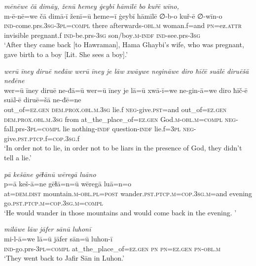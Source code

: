 \ea \label{BP.205}
\textit{mēnēwe čā dimāy, ženū ħemey ġeybī hāmīlē bo kuřē wīno,} \\ 
\gll m-ē-nē=we čā dimā-ī ženī=ū ħeme=ī ġeybī hāmīlē ∅-b-o kuř-ē ∅-wīn-o \\ 
 \textsc{ind-}come.prs\textsc{.3sg}\textsc{-3pl}\textsc{=compl} there afterwards\textsc{-obl}\textsc{.m} woman.f=and \textsc{pn}=ez.\textsc{attr} invisible pregnant.f \textsc{ind-}be.prs\textsc{-3sg} son/boy\textsc{.m}\textsc{-indf} \textsc{ind-}see.prs\textsc{-3sg} \\ 
\glt `After they came back [to Hawraman], Hama Ghaybi’s wife, who was pregnant, gave birth to a boy [Lit. She sees a boy].'
\z 
 
\ea \label{BP.211}
\textit{werū īney diruē neđāw werū īney je lāw xwāywe negināwe diro ħīčē suālē diruēšā neđēne} \\ 
\gll wer=ū īney diruē ne-đā=ū wer=ū īney je lā=ū xwā-ī=we ne-gin-ā=we diro ħīč-ē suāl-ē diruē=šā ne-đē=ne \\ 
 out\_of\textsc{=ez.gen} \textsc{dem.prox}\textsc{.obl}\textsc{.m}\textsc{.3sg} lie.f \textsc{neg-}give\textsc{.pst}=and out\_of\textsc{=ez.gen} \textsc{dem.prox}\textsc{.obl}\textsc{.m}\textsc{.3sg} from at\_the\_place\_of\textsc{=ez.gen} God\textsc{.m}\textsc{-obl}\textsc{.m}\textsc{=compl} \textsc{neg-}fall.prs\textsc{-3pl}\textsc{=compl} lie nothing\textsc{-indf} question\textsc{-indf} lie.f\textsc{=3pl} \textsc{neg-}give\textsc{.pst}\textsc{.ptcp}.f\textsc{=cop}\textsc{.3sg}.f \\ 
\glt `In order not to lie, in order not to be liars in the presence of God, they didn’t tell a lie.'
\z 
 
\ea \label{ŠJ.8}
\textit{pā kešāne gēɫānū wēregā luāno} \\ 
\gll p=ā keš-ā=ne gēɫā=n=ū wēregā luā=n=o \\ 
 at=\textsc{dem.dist} mountain\textsc{.m}\textsc{-obl}\textsc{.pl}\textsc{=\textsc{post}} wander\textsc{.pst}\textsc{.ptcp}\textsc{.m}\textsc{=cop}\textsc{.3sg}\textsc{.m}=and evening go\textsc{.pst}\textsc{.ptcp}\textsc{.m}\textsc{=cop}\textsc{.3sg}\textsc{.m}\textsc{=compl} \\ 
\glt `He would wander in those mountains and would come back in the evening. '
\z 
 
\ea \label{ŠJ.13}
\textit{milāwe lāw jāfer sānū luhonī} \\ 
\gll mi-l-ā=we lā=ū jāfer sān=ū luhon-ī \\ 
 \textsc{ind-}go.prs\textsc{-3pl}\textsc{=compl} at\_the\_place\_of\textsc{=ez.gen} \textsc{pn} \textsc{pn}\textsc{=ez.gen} \textsc{pn}\textsc{-obl}\textsc{.m} \\ 
\glt `They went back to Jafir Sān in Luhon.'
\z 
 
